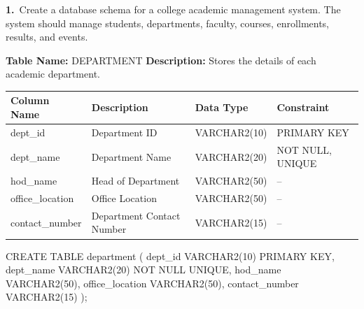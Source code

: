 


{\fontsize{14}{17}\selectfont\textbf{1.}}\ Create a database schema for a
college academic management system. The system should manage students, departments,
faculty, courses, enrollments, results, and events.\par\vspace{10pt}

\textbf{Table Name:} DEPARTMENT \hfill
\textbf{Description:} Stores the details of each academic department.

\vspace{8pt}

\renewcommand{\arraystretch}{1.45}
\begin{tabularx}{\textwidth}{|>{\raggedright\arraybackslash}X|>{\raggedright\arraybackslash}X|>{\raggedright\arraybackslash}X|>{\raggedright\arraybackslash}X|}
\hline
\textbf{Column Name} & \textbf{Description} & \textbf{Data Type} & \textbf{Constraint} \\
\hline
dept\_id         & Department ID             & VARCHAR2(10) & PRIMARY KEY        \\
\hline
dept\_name       & Department Name           & VARCHAR2(20) & NOT NULL, UNIQUE   \\
\hline
hod\_name        & Head of Department        & VARCHAR2(50) & --                 \\
\hline
office\_location & Office Location           & VARCHAR2(50) & --                 \\
\hline
contact\_number  & Department Contact Number & VARCHAR2(15) & --                 \\
\hline
\end{tabularx}

\vspace{16pt}


\begin{sqlcode}
CREATE TABLE department (
    dept_id         VARCHAR2(10)  PRIMARY KEY,
    dept_name       VARCHAR2(20)  NOT NULL UNIQUE,
    hod_name        VARCHAR2(50),
    office_location VARCHAR2(50),
    contact_number  VARCHAR2(15)
);
\end{sqlcode}

